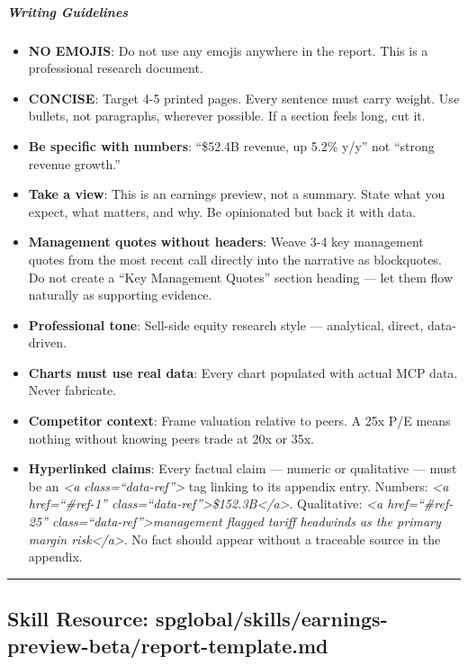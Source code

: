\documentclass[11pt]{article}
\begin{document}
\subparagraph{Writing Guidelines}\mbox{}\par

\begin{itemize}[leftmargin=*,itemsep=2pt,topsep=2pt]
\item {} \textbf{NO EMOJIS}: Do not use any emojis anywhere in the report. This is a professional research document.
\item {} \textbf{CONCISE}: Target 4-5 printed pages. Every sentence must carry weight. Use bullets, not paragraphs, wherever possible. If a section feels long, cut it.
\item {} \textbf{Be specific with numbers}: ``\$52.4B revenue, up 5.2\% y/y'' not ``strong revenue growth.''
\item {} \textbf{Take a view}: This is an earnings preview, not a summary. State what you expect, what matters, and why. Be opinionated but back it with data.
\item {} \textbf{Management quotes without headers}: Weave 3-4 key management quotes from the most recent call directly into the narrative as blockquotes. Do not create a ``Key Management Quotes'' section heading — let them flow naturally as supporting evidence.
\item {} \textbf{Professional tone}: Sell-side equity research style — analytical, direct, data-driven.
\item {} \textbf{Charts must use real data}: Every chart populated with actual MCP data. Never fabricate.
\item {} \textbf{Competitor context}: Frame valuation relative to peers. A 25x P/E means nothing without knowing peers trade at 20x or 35x.
\item {} \textbf{Hyperlinked claims}: Every factual claim — numeric or qualitative — must be an \emph{<a class=``data-ref''>} tag linking to its appendix entry. Numbers: \emph{<a href=``\#ref-1'' class=``data-ref''>\$152.3B</a>}. Qualitative: \emph{<a href=``\#ref-25'' class=``data-ref''>management flagged tariff headwinds as the primary margin risk</a>}. No fact should appear without a traceable source in the appendix.
\end{itemize}

\vspace{0.8em}\hrule\vspace{0.8em}

\subsection{Skill Resource: spglobal/skills/earnings-preview-beta/report-template.md}\label{file:spglobal-skills-earnings-preview-beta-report-template.md}
\end{document}
